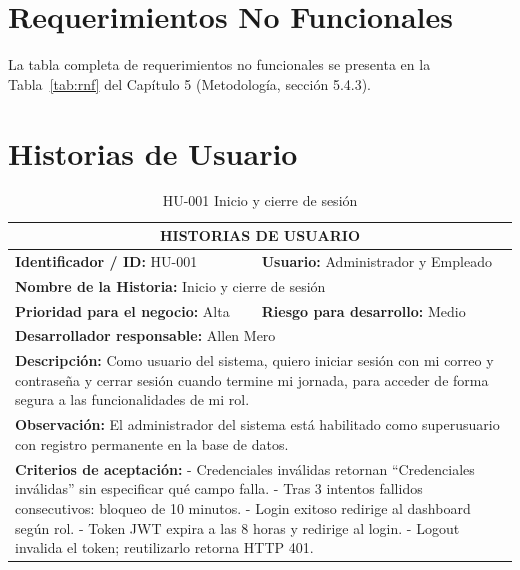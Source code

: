 \documentclass[12pt, letterpaper]{report}
\begin{document}
\chapter{Requerimientos No Funcionales}

La tabla completa de requerimientos no funcionales se presenta en la Tabla~\ref{tab:rnf} del Capítulo 5 (Metodología, sección 5.4.3).

\chapter{Historias de Usuario}

\begin{table}[H]
\centering
\caption{HU-001 Inicio y cierre de sesión}
\begin{tabularx}{\textwidth}{|X X|}
\hline
\multicolumn{2}{|c|}{\textbf{HISTORIAS DE USUARIO}} \\ \hline
\textbf{Identificador / ID:} HU-001 & \textbf{Usuario:} Administrador y Empleado \\ \hline
\multicolumn{2}{|l|}{\textbf{Nombre de la Historia:} Inicio y cierre de sesión} \\ \hline
\textbf{Prioridad para el negocio:} Alta & \textbf{Riesgo para desarrollo:} Medio \\ \hline
\multicolumn{2}{|l|}{\textbf{Desarrollador responsable:} Allen Mero} \\ \hline
\multicolumn{2}{|p{0.95\textwidth}|}{\textbf{Descripción:} Como usuario del sistema, quiero iniciar sesión con mi correo y contraseña y cerrar sesión cuando termine mi jornada, para acceder de forma segura a las funcionalidades de mi rol.} \\ \hline
\multicolumn{2}{|p{0.95\textwidth}|}{\textbf{Observación:} El administrador del sistema está habilitado como superusuario con registro permanente en la base de datos.} \\ \hline
\multicolumn{2}{|p{0.95\textwidth}|}{\textbf{Criterios de aceptación:} \newline
- Credenciales inválidas retornan ``Credenciales inválidas'' sin especificar qué campo falla. \newline
- Tras 3 intentos fallidos consecutivos: bloqueo de 10 minutos. \newline
- Login exitoso redirige al dashboard según rol. \newline
- Token JWT expira a las 8 horas y redirige al login. \newline
- Logout invalida el token; reutilizarlo retorna HTTP 401.} \\ \hline
\end{tabularx}
\end{table}
\end{document}
